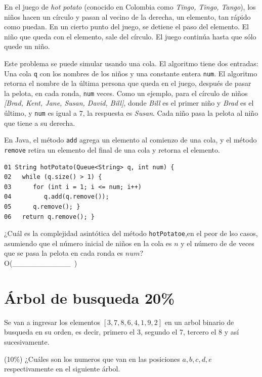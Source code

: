 \documentclass[twocolumn]{article}
\begin{document}
En el juego de \textit{hot potato} (conocido en Colombia como \textit{Tingo, Tingo, Tango}), los niños
hacen un círculo y pasan al vecino de la derecha, un elemento,
 tan rápido como puedan. En un cierto punto del juego,
 se detiene el paso del elemento. El niño que queda con el
 elemento, sale del círculo. El juego continúa
 hasta que sólo quede un niño.

 Este problema se puede simular usando una cola. El algoritmo
 tiene dos entradas: Una cola \texttt{q}  con los nombres de los niños y una constante entera \texttt{num}. El algoritmo retorna el nombre de la última persona que queda en el juego, después de pasar la pelota, en cada ronda, \texttt{num} veces. Como un ejemplo, para el círculo de niños \textit{[Brad, Kent, Jane, Susan, David, Bill]},
donde \textit{Bill} es el primer niño y \textit{Brad} es el último,
y \texttt{num} es igual a 7, la respuesta es \textit{Susan}. Cada niño pasa la pelota al niño que tiene a su derecha.


 En Java, el método \texttt{add} agrega un elemento
 al comienzo de una cola, y el método \texttt{remove} retira un elemento del final de una cola y retorna el elemento.


{\small
\begin{verbatim}
01 String hotPotato(Queue<String> q, int num) {
02   while (q.size() > 1) {
03      for (int i = 1; i <= num; i++) 
04         q.add(q.remove()); 
05      q.remove(); }
06   return q.remove(); }
\end{verbatim}
}

¿Cuál es la complejidad asintótica del método \texttt{hotPotatoe},en el peor de lso casos, asumiendo que el número inicial de niños en la cola es $n$ y el número de de veces que se pasa la pelota
en cada ronda es $num$? \\

O(\_\_\_\_\_\_\_\_\_\_\_\ )


\section{Árbol de busqueda 20\%}
 Se van a ingresar los elementos $[3, 7, 8, 6, 4, 1, 9, 2]$ en un arbol binario de busqueda en su orden, es decir, primero el 3, segundo el 7, tercero el 8 y así sucesivamente. 

 (10\%) ¿Cuáles son los numeros que van en las posiciones $a, b, c, d, e$ respectivamente en el siguiente árbol.
\\
\begin{center}
\end{center}
\end{document}
